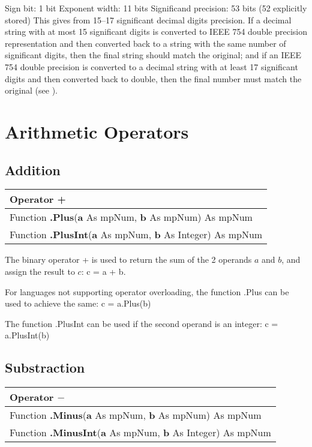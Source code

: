 Sign bit: 1 bit
Exponent width: 11 bits
Significand precision: 53 bits (52 explicitly stored)
This gives from 15–17 significant decimal digits precision. If a decimal string with at most 15 significant digits is converted to IEEE 754 double precision representation and then converted back to a string with the same number of significant digits, then the final string should match the original; and if an IEEE 754 double precision is converted to a decimal string with at least 17 significant digits and then converted back to double, then the final number must match the original (see \cite{Kahan_1997}).







\section{Arithmetic Operators}
\label{FpArithmeticOperators}

\subsection{Addition }
\begin{tabular}{p{481pt}}
	\toprule
	\textsf{Operator \textbf{+}}\index{Multiprecision Functions!+} \\
	\midrule
	\textsf{Function \textbf{.Plus}(\textbf{a} As mpNum, \textbf{b} As mpNum) As mpNum}\index{Multiprecision Functions!.Plus} \\
	\textsf{Function \textbf{.PlusInt}(\textbf{a} As mpNum, \textbf{b} As Integer) As mpNum}\index{Multiprecision Functions!.PlusInt} \\
	\bottomrule
\end{tabular}

\vspace{0.3cm}
The binary operator + is used to return the sum of the 2 operands $a$ and $b$, and assign the result to $c$: \textsf{c = a + b}.

For languages not supporting operator overloading, the function \textsf{.Plus} can be used to achieve the same: \textsf{c = a.Plus(b)}

The function \textsf{.PlusInt}  can be used if the second operand is an integer: \textsf{c = a.PlusInt(b)}



\subsection{Substraction}
\begin{tabular}{p{481pt}}
	\toprule
	\textsf{Operator \textbf{$-$}}\index{Multiprecision Functions!$-$} \\
	\midrule
	\textsf{Function \textbf{.Minus}(\textbf{a} As mpNum, \textbf{b} As mpNum) As mpNum}\index{Multiprecision Functions!.Minus} \\
	\textsf{Function \textbf{.MinusInt}(\textbf{a} As mpNum, \textbf{b} As Integer) As mpNum}\index{Multiprecision Functions!.MinusInt} \\
	\bottomrule
\end{tabular}


